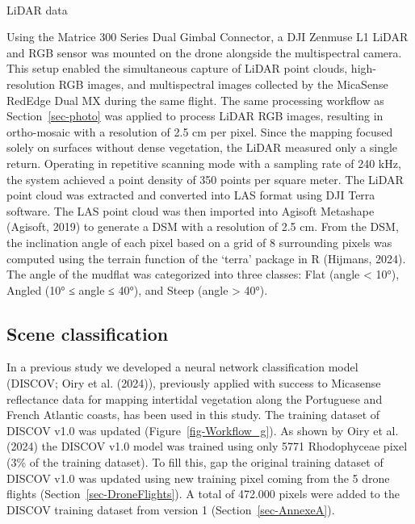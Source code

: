 \documentclass[
  letterpaper,
  11pt,
  english,
  singlespacing,
  headsepline]{MastersDoctoralThesis}
\makeatletter
\let\oldparagraph\paragraph
\renewcommand{\paragraph}{
    \@ifstar
      \xxxParagraphStar
      \xxxParagraphNoStar
  }
\newcommand{\xxxParagraphStar}[1]{\oldparagraph*{#1}\mbox{}}
\newcommand{\xxxParagraphNoStar}[1]{\oldparagraph{#1}\mbox{}}
\makeatother
\begin{document}
\begin{spacing}{1.5}
\paragraph{LiDAR data}\label{lidar-data}

Using the Matrice 300 Series Dual Gimbal Connector, a DJI Zenmuse L1
LiDAR and RGB sensor was mounted on the drone alongside the
multispectral camera. This setup enabled the simultaneous capture of
LiDAR point clouds, high-resolution RGB images, and multispectral images
collected by the MicaSense RedEdge Dual MX during the same flight. The
same processing workflow as Section~\ref{sec-photo} was applied to
process LiDAR RGB images, resulting in ortho-mosaic with a resolution of
2.5 cm per pixel. Since the mapping focused solely on surfaces without
dense vegetation, the LiDAR measured only a single return. Operating in
repetitive scanning mode with a sampling rate of 240 kHz, the system
achieved a point density of 350 points per square meter. The LiDAR point
cloud was extracted and converted into LAS format using DJI Terra
software. The LAS point cloud was then imported into Agisoft Metashape
(Agisoft, 2019) to generate a DSM with a resolution of 2.5 cm. From the
DSM, the inclination angle of each pixel based on a grid of 8
surrounding pixels was computed using the terrain function of the
`terra' package in R (Hijmans, 2024). The angle of the mudflat was
categorized into three classes: Flat (angle \textless{} 10°), Angled
(10° ≤ angle ≤ 40°), and Steep (angle \textgreater{} 40°).

\subsection{Scene classification}\label{scene-classification}

In a previous study we developed a neural network classification model
(DISCOV; Oiry et al. (2024)), previously applied with success to
Micasense reflectance data for mapping intertidal vegetation along the
Portuguese and French Atlantic coasts, has been used in this study. The
training dataset of DISCOV v1.0 was updated
(Figure~\ref{fig-Workflow_g}). As shown by Oiry et al. (2024) the DISCOV
v1.0 model was trained using only 5771 Rhodophyceae pixel (3\% of the
training dataset). To fill this, gap the original training dataset of
DISCOV v1.0 was updated using new training pixel coming from the 5 drone
flights (Section~\ref{sec-DroneFlights}). A total of 472.000 pixels were
added to the DISCOV training dataset from version 1
(Section~\ref{sec-AnnexeA}).


\end{spacing}
\end{document}
